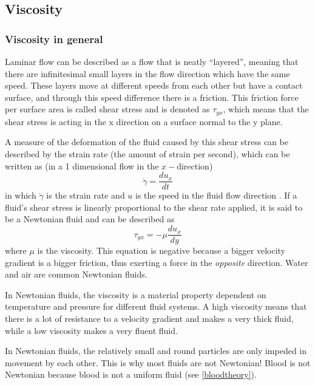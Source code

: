 \subsection{Viscosity}
\label{viscositysection}
\subsubsection{Viscosity in general}
Laminar flow can be described as a flow that is neatly ``layered'', meaning that there are infinitesimal small layers in the flow direction which have the same speed. These layers move at different speeds from each other but have a contact surface, and through this speed difference there is a friction. This friction force per surface area is called shear stress and is denoted as $\tau_{yx}$, which means that the shear stress is acting in the x direction on a surface normal to the y plane. 

A measure of the deformation of the fluid caused by this shear stress can be described by the strain rate (the amount of strain per second), which can be written as (in a 1 dimensional flow in the $x-$direction)
\begin{equation}
\dot{\gamma} = \frac{du_{x}}{dt}
\end{equation}
in which $\dot{\gamma}$ is the strain rate and $u$ is the speed in the fluid flow direction \cite{nonnewtonianflow}. If a fluid's shear stress is linearly proportional to the shear rate applied, it is said to be a Newtonian fluid and can be described as
\begin{equation}
\tau_{yx}= -\mu \frac{du_{x}}{dy}
\end{equation}
where $\mu$ is the viscosity. This equation is negative because a bigger velocity gradient is a bigger friction, thus exerting a force in the \emph{opposite} direction\cite{FT}. Water and air are common Newtonian fluids.

In Newtonian fluids, the viscosity is a material property dependent on temperature and pressure for different fluid systems. A high viscosity means that there is a lot of resistance to a velocity gradient and makes a very thick fluid, while a low viscosity makes a very fluent fluid.

In Newtonian fluids, the relatively small and round particles are only impeded in movement by each other. This is why most fluids are not Newtonian! Blood is not Newtonian because blood is not a uniform fluid (see \autoref{bloodtheory}).
